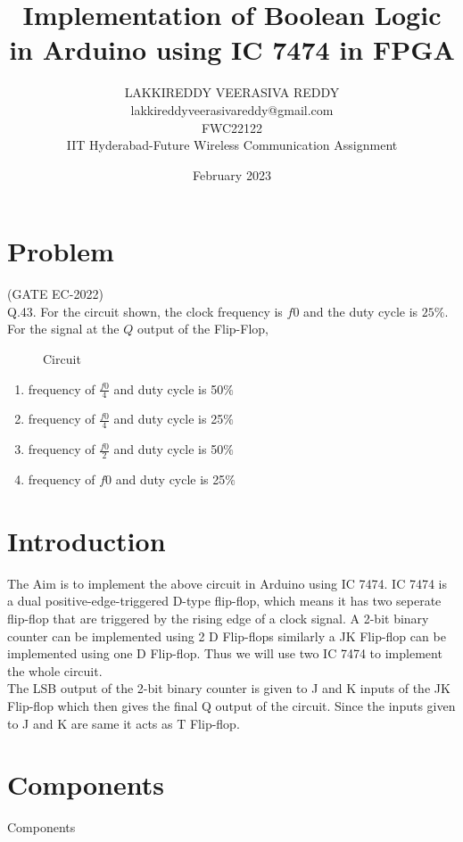 \documentclass{article}
\title{Implementation of Boolean Logic in Arduino using IC 7474 in FPGA}
\date{February 2023}
\author{LAKKIREDDY VEERASIVA REDDY\\lakkireddyveerasivareddy@gmail.com\\FWC22122\\IIT Hyderabad-Future Wireless Communication Assignment}
\date{}
\begin{document}
\maketitle
	\tableofcontents

\pagebreak
\section{Problem}
	(GATE EC-2022)\\
	Q.43. For the circuit shown, the clock frequency is $f0$ and the duty cycle is $25 \%$. For the signal at the $Q$ output of the Flip-Flop,
\\
	\begin{figure}[h]
		\centering
	
		\caption{Circuit}
		\label{fig:1}
	\end{figure}

\begin{enumerate}
	\item frequency of $\frac{f0}{4}$ and duty cycle is 50$\%$
	\item frequency of $\frac{f0}{4}$ and duty cycle is 25$\%$
	\item frequency of $\frac{f0}{2}$ and duty cycle is 50$\%$
	\item frequency of $f0$ and duty cycle is 25$\%$ \\
\end{enumerate}

\section{Introduction}
		The Aim is to implement the above circuit in Arduino using IC 7474. IC 7474 is a dual positive-edge-triggered D-type flip-flop, which means it has two seperate flip-flop that are triggered by the rising edge of a clock signal. A 2-bit binary counter can be implemented using 2 D Flip-flops similarly a JK Flip-flop can be implemented using one D Flip-flop. Thus we will use two IC 7474 to implement the whole circuit.\\

		The LSB output of the 2-bit binary counter is given to J and K inputs of the JK Flip-flop which then gives the final Q output of the circuit. Since the inputs given to J and K are same it acts as T Flip-flop.\\
\section{Components}
	\begin{table}[h]
		\begin{center}
			
			\caption{Components}
			\label{table:1}
		\end{center}
	\end{table}
\pagebreak
\end{document}

